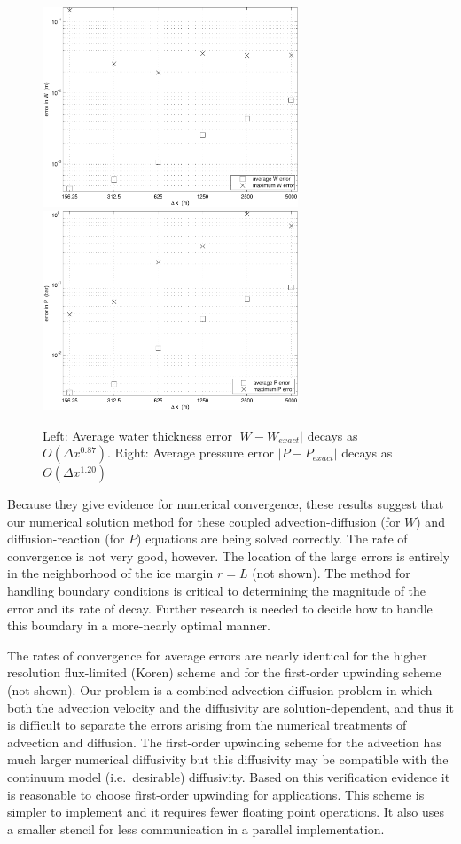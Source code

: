 \documentclass[11pt,final]{amsart}
\begin{document}
\begin{figure}[ht]
\includegraphics[width=3.0in,keepaspectratio=true]{refineWpism} \quad \includegraphics[width=3.0in,keepaspectratio=true]{refinePpism}
\caption{Left: Average water thickness error $|W-W_{exact}|$ decays as $O(\Delta x^{0.87})$.  Right: Average pressure error $|P-P_{exact}|$ decays as $O(\Delta x^{1.20})$}
\label{fig:refineWPpism}
\end{figure}

Because they give evidence for numerical convergence, these results suggest that our numerical solution method for these coupled advection-diffusion (for $W$) and diffusion-reaction (for $P$) equations are being solved correctly.  The rate of convergence is not very good, however.  The location of the large errors is entirely in the neighborhood of the ice margin $r=L$ (not shown).  The method for handling boundary conditions is critical to determining the magnitude of the error and its rate of decay.  Further research is needed to decide how to handle this boundary in a more-nearly optimal manner.

The rates of convergence for average errors are nearly identical for the higher resolution flux-limited (Koren) scheme and for the first-order upwinding scheme (not shown).  Our problem is a combined advection-diffusion problem in which both the advection velocity and the diffusivity are solution-dependent, and thus it is difficult to separate the errors arising from the numerical treatments of advection and diffusion.  The first-order upwinding scheme for the advection has much larger numerical diffusivity but this diffusivity may be compatible with the continuum model (i.e.~desirable) diffusivity.  Based on this verification evidence it is reasonable to choose first-order upwinding for applications.  This scheme is simpler to implement and it requires fewer floating point operations.  It also uses a smaller stencil for less communication in a parallel implementation.
\end{document}

